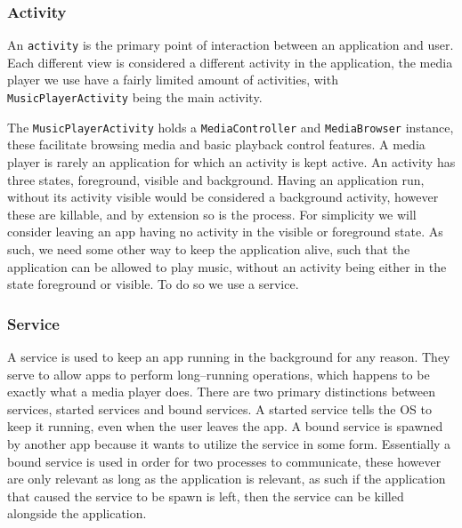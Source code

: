 \subsubsection{Activity}
An \texttt{activity} is the primary point of interaction between an application and user.
Each different view is considered a different activity in the application, the media player we use have a fairly limited amount of activities, with \texttt{MusicPlayerActivity} being the main activity.

The \texttt{MusicPlayerActivity} holds a \texttt{MediaController} and \texttt{MediaBrowser} instance, these facilitate browsing media and basic playback control features.
A media player is rarely an application for which an activity is kept active.
An activity has three states, foreground, visible and background.
Having an application run, without its activity visible would be considered a background activity, however these are killable, and by extension so is the process.
For simplicity we will consider leaving an app having no activity in the visible or foreground state.
As such, we need some other way to keep the application alive, such that the application can be allowed to play music, without an activity being either in the state foreground or visible.
To do so we use a service.



\subsubsection{Service}
A service is used to keep an app running in the background for any reason.
They serve to allow apps to perform long--running operations, which happens to be exactly what a media player does.
There are two primary distinctions between services, started services and bound services.
A started service tells the OS to keep it running, even when the user leaves the app.
A bound service is spawned by another app because it wants to utilize the service in some form.
Essentially a bound service is used in order for two processes to communicate, these however are only relevant as long as the application is relevant, as such if the application that caused the service to be spawn is left, then the service can be killed alongside the application.\cite{androidFundamentals}

